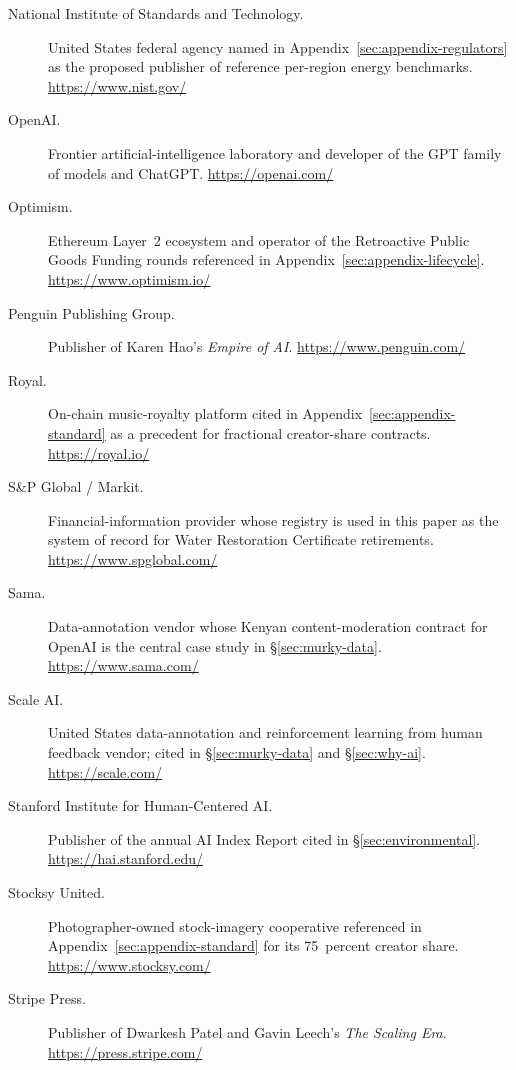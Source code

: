 \documentclass[10pt,a4paper,twocolumn]{article}
\begin{document}
\begin{description}
\item[National Institute of Standards and Technology.] United States federal agency named in Appendix~\ref{sec:appendix-regulators} as the proposed publisher of reference per-region energy benchmarks. \url{https://www.nist.gov/}

\item[OpenAI.] Frontier artificial-intelligence laboratory and developer of the GPT family of models and ChatGPT. \url{https://openai.com/}

\item[Optimism.] Ethereum Layer~2 ecosystem and operator of the Retroactive Public Goods Funding rounds referenced in Appendix~\ref{sec:appendix-lifecycle}. \url{https://www.optimism.io/}

\item[Penguin Publishing Group.] Publisher of Karen Hao's \emph{Empire of AI}. \url{https://www.penguin.com/}

\item[Royal.] On-chain music-royalty platform cited in Appendix~\ref{sec:appendix-standard} as a precedent for fractional creator-share contracts. \url{https://royal.io/}

\item[S\&P Global / Markit.] Financial-information provider whose registry is used in this paper as the system of record for Water Restoration Certificate retirements. \url{https://www.spglobal.com/}

\item[Sama.] Data-annotation vendor whose Kenyan content-moderation contract for OpenAI is the central case study in \S\ref{sec:murky-data}. \url{https://www.sama.com/}

\item[Scale AI.] United States data-annotation and reinforcement learning from human feedback vendor; cited in \S\ref{sec:murky-data} and \S\ref{sec:why-ai}. \url{https://scale.com/}

\item[Stanford Institute for Human-Centered AI.] Publisher of the annual AI Index Report cited in \S\ref{sec:environmental}. \url{https://hai.stanford.edu/}

\item[Stocksy United.] Photographer-owned stock-imagery cooperative referenced in Appendix~\ref{sec:appendix-standard} for its 75~percent creator share. \url{https://www.stocksy.com/}

\item[Stripe Press.] Publisher of Dwarkesh Patel and Gavin Leech's \emph{The Scaling Era}. \url{https://press.stripe.com/}


\end{description}
\end{document}
